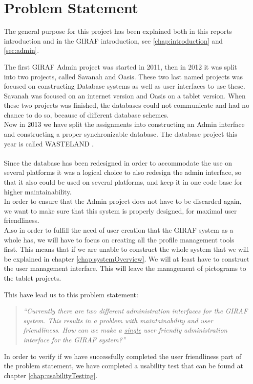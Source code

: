 \chapter{Problem Statement}
The general purpose for this project has been explained both in this reports introduction and in the GIRAF introduction, see \ref{chap:introduction} and \ref{sec:admin}.

The first GIRAF Admin project was started in 2011, then in 2012 it was split into two projects, called Savanah and Oasis. These two last named projects was focused on constructing Database systems as well as user interfaces to use these. Savanah was focused on an internet version and Oasis on a tablet version. When these two projects was finished, the databases could not communicate and had no chance to do so, because of different database schemes.\\
Now in 2013 we have split the assignments into constructing an Admin interface and constructing a proper synchronizable database. The database project this year is called WASTELAND \citep{wasteland}.\\
\\
Since the database has been redesigned in order to accommodate the use on several platforms it was a logical choice to also redesign the admin interface, so that it also could be used on several platforms, and keep it in one code base for higher maintainability.\\
In order to ensure that the Admin project does not have to be discarded again, we want to make sure that this system is properly designed, for maximal user friendliness.\\
Also in order to fulfill the need of user creation that the GIRAF system as a whole has, we will have to focus on creating all the profile management tools first. This means that if we are unable to construct the whole system that we will be explained in chapter \vref{chap:systemOverview}. We will at least have to construct the user management interface. This will leave the management of pictograms to the tablet projects.

This have lead us to this problem statement:
\begin{verse}
\textit{``Currently there are two different administration interfaces for the GIRAF system.
This results in a problem with maintainability and user friendliness.
How can we make a \underline{single} user friendly administration interface for the GIRAF system?''}
\end{verse}

In order to verify if we have successfully completed the user friendliness part of the problem statement, we have completed a usability test that can be found at chapter \vref{chap:usabilityTesting}.
